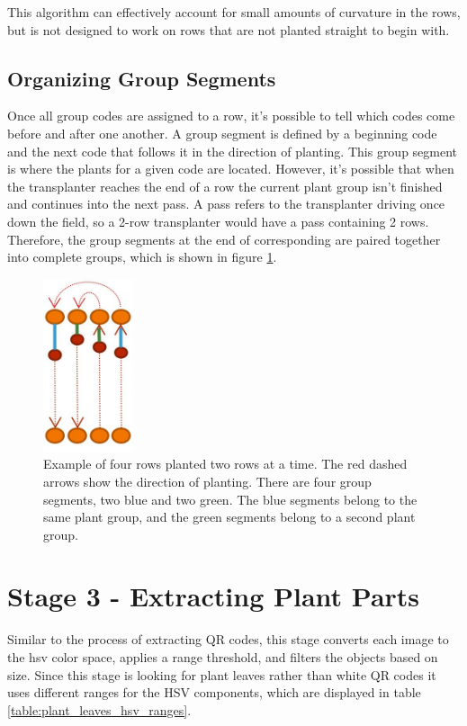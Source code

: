 This algorithm can effectively account for small amounts of curvature in the rows, but is not designed to work on rows that are not planted straight to begin with.

\subsection{Organizing Group Segments}

Once all group codes are assigned to a row, it's possible to tell which codes come before and after one another.  A group segment is defined by a beginning code and the next code that follows it in the direction of planting.  This group segment is where the plants for a given code are located.  However, it's possible that when the transplanter reaches the end of a row the current plant group isn't finished and continues into the next pass.  A pass refers to the transplanter driving once down the field, so a 2-row transplanter would have a pass containing 2 rows.  Therefore, the group segments at the end of corresponding are paired together into complete groups, which is shown in figure \ref{figure:group_segments}.

\begin{figure}
	\centering
    \includegraphics[height=2in]{figures/group_segments.jpg}
    \caption[Group segments]{Example of four rows planted two rows at a time.  The red dashed arrows show the direction of planting.  There are four group segments, two blue and two green.  The blue segments belong to the same plant group, and the green segments belong to a second plant group.}
    \label{figure:group_segments}
\end{figure}

\section{Stage 3 - Extracting Plant Parts}
\label{processing-stage3}

Similar to the process of extracting QR codes, this stage converts each image to the \ac{hsv} color space, applies a range threshold, and filters the objects based on size.  Since this stage is looking for plant leaves rather than white QR codes it uses different ranges for the HSV components, which are displayed in table \ref{table:plant_leaves_hsv_ranges}.  

